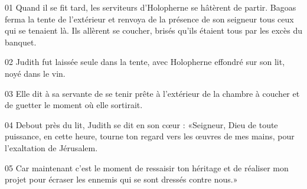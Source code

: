 01 Quand il se fit tard, les serviteurs d'Holopherne se hâtèrent de partir. Bagoas ferma la tente de l'extérieur et renvoya de la présence de son seigneur tous ceux qui se tenaient là. Ils allèrent se coucher, brisés qu'ils étaient tous par les excès du banquet.

02 Judith fut laissée seule dans la tente, avec Holopherne effondré sur son lit, noyé dans le vin.

03 Elle dit à sa servante de se tenir prête à l'extérieur de la chambre à coucher et de guetter le moment où elle sortirait.

04 Debout près du lit, Judith se dit en son cœur : «Seigneur, Dieu de toute puissance, en cette heure, tourne ton regard vers les œuvres de mes mains, pour l'exaltation de Jérusalem.

05 Car maintenant c'est le moment de ressaisir ton héritage et de réaliser mon projet pour écraser les ennemis qui se sont dressés contre nous.»
